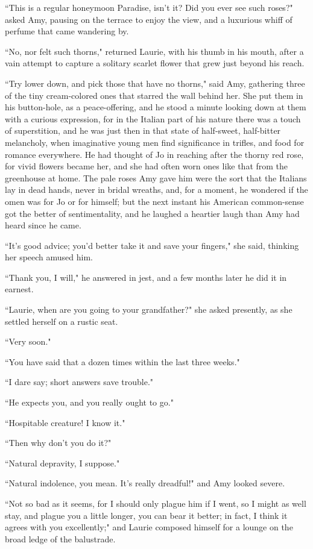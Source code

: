 ``This is a regular honeymoon Paradise, isn't it? Did you
ever see such roses?" asked Amy, pausing on the terrace to enjoy the
view, and a luxurious whiff of perfume that came wandering by.

``No, nor felt such thorns," returned Laurie, with his thumb in his
mouth, after a vain attempt to capture a solitary scarlet flower that
grew just beyond his reach.

``Try lower down, and pick those that have no thorns," said Amy,
gathering three of the tiny cream-colored ones that starred the wall
behind her. She put them in his button-hole, as a peace-offering, and he
stood a minute looking down at them with a curious expression, for in
the Italian part of his nature there was a touch of superstition, and he
was just then in that state of half-sweet, half-bitter melancholy, when
imaginative young men find significance in trifles, and food for romance
everywhere. He had thought of Jo in reaching after the thorny red rose,
for vivid flowers became her, and she had often worn ones like that from
the greenhouse at home. The pale roses Amy gave him were the sort that
the Italians lay in dead hands, never in bridal wreaths, and, for a
moment, he wondered if the omen was for Jo or for himself; but the next
instant his American common-sense got the better of sentimentality, and
he laughed a heartier laugh than Amy had heard since he came.

``It's good advice; you'd better take it
and save your fingers," she said, thinking her speech amused him.

``Thank you, I will," he answered in jest, and a few months later he did
it in earnest.

``Laurie, when are you going to your grandfather?" she asked presently,
as she settled herself on a rustic seat.

``Very soon."

``You have said that a dozen times within the last three weeks."

``I dare say; short answers save trouble."

``He expects you, and you really ought to go."

``Hospitable creature! I know it."

``Then why don't you do it?"

``Natural depravity, I suppose."

``Natural indolence, you mean. It's really dreadful!" and
Amy looked severe.

``Not so bad as it seems, for I should only plague him if I went, so I
might as well stay, and plague you a little longer, you can bear it
better; in fact, I think it agrees with you excellently;" and Laurie
composed himself for a lounge on the broad ledge of the balustrade.

